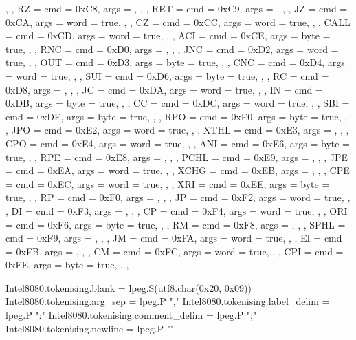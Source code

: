 {{{        },
    },
    RZ   = {
        { cmd = 0xC8, args = {}, },
    },
    RET  = {
        { cmd = 0xC9, args = {}, },
    },
    JZ   = {
        { cmd = 0xCA, args = {{word = true}}, },
    },
    CZ   = {
        { cmd = 0xCC, args = {{word = true}}, },
    },
    CALL = {
        { cmd = 0xCD, args = {{word = true}}, },
    },
    ACI  = {
        { cmd = 0xCE, args = {{byte = true}}, },
    },
    RNC  = {
        { cmd = 0xD0, args = {}, },
    },
    JNC  = {
        { cmd = 0xD2, args = {{word = true}}, },
    },
    OUT  = {
        { cmd = 0xD3, args = {{byte = true}}, },
    },
    CNC  = {
        { cmd = 0xD4, args = {{word = true}}, },
    },
    SUI  = {
        { cmd = 0xD6, args = {{byte = true}}, },
    },
    RC   = {
        { cmd = 0xD8, args = {}, },
    },
    JC   = {
        { cmd = 0xDA, args = {{word = true}}, },
    },
    IN   = {
        { cmd = 0xDB, args = {{byte = true}}, },
    },
    CC   = {
        { cmd = 0xDC, args = {{word = true}}, },
    },
    SBI  = {
        { cmd = 0xDE, args = {{byte = true}}, },
    },
    RPO  = {
        { cmd = 0xE0, args = {{byte = true}}, },
    },
    JPO  = {
        { cmd = 0xE2, args = {{word = true}}, },
    },
    XTHL = {
        { cmd = 0xE3, args = {}, },
    },
    CPO  = {
        { cmd = 0xE4, args = {{word = true}}, },
    },
    ANI  = {
        { cmd = 0xE6, args = {{byte = true}}, },
    },
    RPE  = {
        { cmd = 0xE8, args = {}, },
    },
    PCHL = {
        { cmd = 0xE9, args = {}, },
    },
    JPE  = {
        { cmd = 0xEA, args = {{word = true}}, },
    },
    XCHG = {
        { cmd = 0xEB, args = {}, },
    },
    CPE  = {
        { cmd = 0xEC, args = {{word = true}}, },
    },
    XRI  = {
        { cmd = 0xEE, args = {{byte = true}}, },
    },
    RP   = {
        { cmd = 0xF0, args = {}, },
    },
    JP   = {
        { cmd = 0xF2, args = {{word = true}}, },
    },
    DI   = {
        { cmd = 0xF3, args = {}, },
    },
    CP   = {
        { cmd = 0xF4, args = {{word = true}}, },
    },
    ORI  = {
        { cmd = 0xF6, args = {{byte = true}}, },
    },
    RM   = {
        { cmd = 0xF8, args = {}, },
    },
    SPHL = {
        { cmd = 0xF9, args = {}, },
    },
    JM   = {
        { cmd = 0xFA, args = {{word = true}}, },
    },
    EI   = {
        { cmd = 0xFB, args = {}, },
    },
    CM   = {
        { cmd = 0xFC, args = {{word = true}}, },
    },
    CPI  = {
        { cmd = 0xFE, args = {{byte = true}}, },
    },
}

Intel8080.tokenising.blank = lpeg.S(utf8.char(0x20, 0x09))
Intel8080.tokenising.arg_sep = lpeg.P ","
Intel8080.tokenising.label_delim = lpeg.P ":"
Intel8080.tokenising.comment_delim = lpeg.P ";"
Intel8080.tokenising.newline = lpeg.P "\n"

